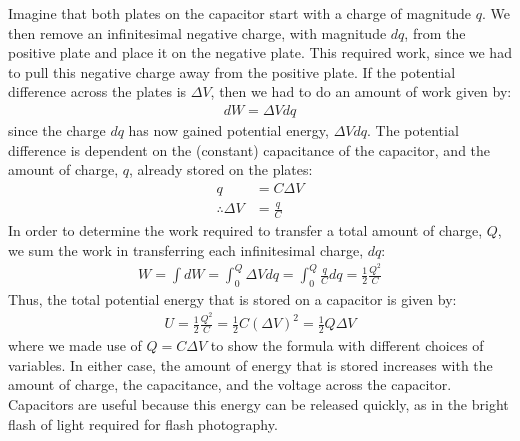 Imagine that both plates on the capacitor start with a charge of magnitude $q$. We then remove an infinitesimal negative charge, with magnitude $dq$, from the positive plate and place it on the negative plate. This required work, since we had to pull this negative charge away from the positive plate. If the potential difference across the plates is $\Delta V$, then we had to do an amount of work given by:
\begin{align*}
dW = \Delta Vdq
\end{align*}
since the charge $dq$ has now gained potential energy, $\Delta Vdq$. The potential difference is dependent on the (constant) capacitance of the capacitor, and the amount of charge, $q$, already stored on the plates:
\begin{align*}
q &= C\Delta V\\
\therefore \Delta V&=\frac{q}{C}
\end{align*}
In order to determine the work required to transfer a total amount of charge, $Q$, we sum the work in transferring each infinitesimal charge, $dq$:
\begin{align*}
W=\int dW=\int_0^Q \Delta Vdq=\int_0^Q \frac{q}{C}dq=\frac{1}{2}\frac{Q^2}{C}
\end{align*}
Thus, the total potential energy that is stored on a capacitor is given by:
\begin{align*}
U = \frac{1}{2}\frac{Q^2}{C} = \frac{1}{2}C(\Delta V)^2=\frac{1}{2}Q\Delta V
\end{align*}
where we made use of $Q=C\Delta V$ to show the formula with different choices of variables. In either case, the amount of energy that is stored increases with the amount of charge, the capacitance, and the voltage across the capacitor. Capacitors are useful because this energy can be released quickly, as in the bright flash of light required for flash photography.

\newpage
